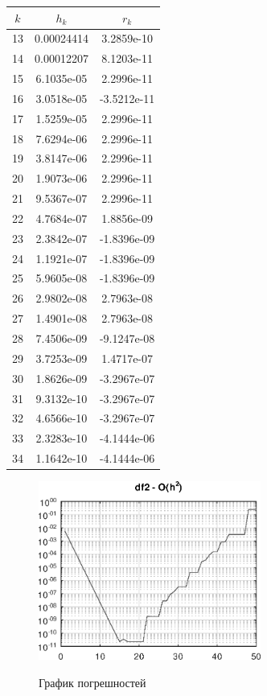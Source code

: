 \documentclass{article}
\begin{document}
		
		\begin{table}[h!]
			\centering
			\begin{tabular}{|c|c|c|}
				\hline
				$k$  & $h_k$       & $r_k$        \\ \hline
				13 & 0.00024414 & 3.2859e-10  \\ \hline
				14 & 0.00012207 & 8.1203e-11  \\ \hline
				15 & 6.1035e-05 & 2.2996e-11  \\ \hline
				16 & 3.0518e-05 & -3.5212e-11 \\ \hline
				17 & 1.5259e-05 & 2.2996e-11  \\ \hline
				18 & 7.6294e-06 & 2.2996e-11  \\ \hline
				19 & 3.8147e-06 & 2.2996e-11  \\ \hline
				20 & 1.9073e-06 & 2.2996e-11  \\ \hline
				21 & 9.5367e-07 & 2.2996e-11  \\ \hline
				22 & 4.7684e-07 & 1.8856e-09  \\ \hline
				23 & 2.3842e-07 & -1.8396e-09 \\ \hline
				24 & 1.1921e-07 & -1.8396e-09 \\ \hline
				25 & 5.9605e-08 & -1.8396e-09 \\ \hline
				26 & 2.9802e-08 & 2.7963e-08  \\ \hline
				27 & 1.4901e-08 & 2.7963e-08  \\ \hline
				28 & 7.4506e-09 & -9.1247e-08 \\ \hline
				29 & 3.7253e-09 & 1.4717e-07  \\ \hline
				30 & 1.8626e-09 & -3.2967e-07 \\ \hline
				31 & 9.3132e-10 & -3.2967e-07 \\ \hline
				32 & 4.6566e-10 & -3.2967e-07 \\ \hline
				33 & 2.3283e-10 & -4.1444e-06 \\ \hline
				34 & 1.1642e-10 & -4.1444e-06 \\ \hline
			\end{tabular}
		\end{table}
		
		
		
	\newpage
	\begin{figure}[h!] 
		\centering
		\renewcommand{\figurename}{Рисунок}
		\includegraphics [width=0.65\textwidth]{../img/df2}\\ 
		\caption{График погрешностей  \label{fig.2}}
	\end{figure}
	
\end{document}
